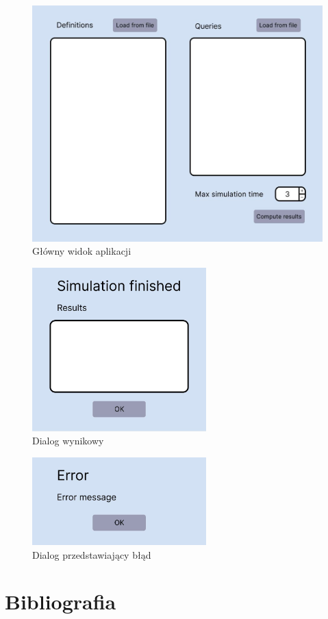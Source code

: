 \documentclass{article}
\begin{document}
\begin{figure}[H]
    \centering
    \includegraphics[width=\textwidth]{images/main_view.JPG}
    \caption { Główny widok aplikacji }
    \label{fig:main_view}
\end{figure}

\begin{figure}[H]
    \centering
    \includegraphics[width=0.6\textwidth]{images/success.JPG}
    \caption { Dialog wynikowy }
    \label{fig:success}
\end{figure}

\begin{figure}[H]
    \centering
    \includegraphics[width=0.6\textwidth]{images/error.JPG}
    \caption { Dialog przedstawiający błąd }
    \label{fig:error}
\end{figure}


\section{Bibliografia}
\end{document}
